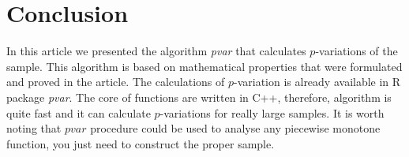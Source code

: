 \documentclass[12pt, a4paper]{article}
\numberwithin{equation}{section}
\begin{document}
  
\section{Conclusion}  
  
In this article we presented the algorithm
\emph{pvar} that calculates
$p$-variations of the sample. 
This algorithm is based on mathematical properties that 
were formulated and proved in the article.
The calculations of $p$-variation
is already available in R package \emph{pvar}.
The core of functions are written in C++,
therefore, algorithm is quite fast and it can calculate
$p$-variations for really large samples.
It is worth noting that $pvar$ procedure
could be used to analyse any 
piecewise monotone function, 
you just need to construct the proper sample.
  
  
\end{document}
